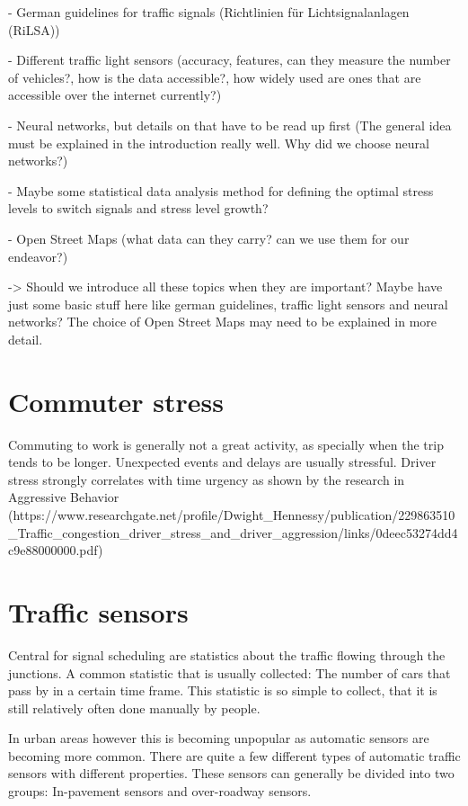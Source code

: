 - German guidelines for traffic signals (Richtlinien für Lichtsignalanlagen (RiLSA))

- Different traffic light sensors (accuracy, features, can they measure the number of vehicles?, how is the data accessible?, how widely used are ones that are accessible over the internet currently?)

- Neural networks, but details on that have to be read up first (The general idea must be explained in the introduction really well. Why did we choose neural networks?)

- Maybe some statistical data analysis method for defining the optimal stress levels to switch signals and stress level growth?

- Open Street Maps (what data can they carry? can we use them for our endeavor?)

-> Should we introduce all these topics when they are important? Maybe have just some basic stuff here like german guidelines, traffic light sensors and neural networks? The choice of Open Street Maps may need to be explained in more detail.

\newpage

\section{Commuter stress}

Commuting to work is generally not a great activity, as specially when the trip tends to be longer. Unexpected events and delays are usually stressful. Driver stress strongly correlates with time urgency as shown by the research in Aggressive Behavior (https://www.researchgate.net/profile/Dwight_Hennessy/publication/229863510_Traffic_congestion_driver_stress_and_driver_aggression/links/0deec53274dd4c9e88000000.pdf)

\section{Traffic sensors}

Central for signal scheduling are statistics about the traffic flowing through the junctions. A common statistic that is usually collected: The number of cars that pass by in a certain time frame. This statistic is so simple to collect, that it is still relatively often done manually by people.

In urban areas however this is becoming unpopular as automatic sensors are becoming more common. There are quite a few different types of automatic traffic sensors with different properties. These sensors can generally be divided into two groups: In-pavement sensors and over-roadway sensors.

